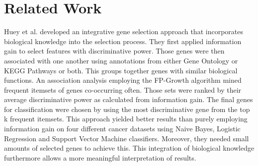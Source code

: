 \chapter{Related Work}
\label{chapter:relatedWork}


Huey et al. developed an integrative gene selection approach that incorporates biological knowledge into the selection process. They first applied information gain to select features with discriminative power. Those genes were then associated with one another using annotations from either Gene Ontology or KEGG Pathways or both. This groups together genes with similar biological functions. An association analysis employing the FP-Growth algorithm mined frequent itemsets of genes co-occurring  often. Those sets were ranked by their average discriminative power as calculated from information gain. The final genes for classification were chosen by using the most discriminative gene from the top k frequent itemsets. This approach yielded better results than purely employing information gain on four different cancer datasets using Naive Bayes, Logistic Regression and Support Vector Machine classifiers. Moreover, they needed small amounts of selected genes to achieve this. This integration of biological knowledge furthermore allows a more meaningful interpretation of results. 
\cite{Huey2014}